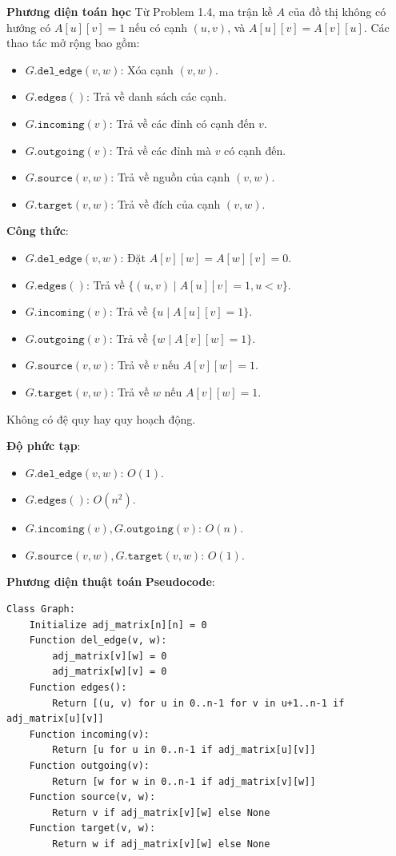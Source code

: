 \documentclass[a4paper,12pt]{article}
\begin{document}
\textbf{Phương diện toán học}
Từ Problem 1.4, ma trận kề \( A \) của đồ thị không có hướng có \( A[u][v] = 1 \) nếu có cạnh \( (u,v) \), và \( A[u][v] = A[v][u] \). Các thao tác mở rộng bao gồm:
\begin{itemize}
    \item \( G.\texttt{del\_edge}(v, w) \): Xóa cạnh \( (v,w) \).
    \item \( G.\texttt{edges}() \): Trả về danh sách các cạnh.
    \item \( G.\texttt{incoming}(v) \): Trả về các đỉnh có cạnh đến \( v \).
    \item \( G.\texttt{outgoing}(v) \): Trả về các đỉnh mà \( v \) có cạnh đến.
    \item \( G.\texttt{source}(v, w) \): Trả về nguồn của cạnh \( (v,w) \).
    \item \( G.\texttt{target}(v, w) \): Trả về đích của cạnh \( (v,w) \).
\end{itemize}

\textbf{Công thức}:
\begin{itemize}
    \item \( G.\texttt{del\_edge}(v, w) \): Đặt \( A[v][w] = A[w][v] = 0 \).
    \item \( G.\texttt{edges}() \): Trả về \( \{(u,v) \mid A[u][v] = 1, u < v\} \).
    \item \( G.\texttt{incoming}(v) \): Trả về \( \{u \mid A[u][v] = 1\} \).
    \item \( G.\texttt{outgoing}(v) \): Trả về \( \{w \mid A[v][w] = 1\} \).
    \item \( G.\texttt{source}(v, w) \): Trả về \( v \) nếu \( A[v][w] = 1 \).
    \item \( G.\texttt{target}(v, w) \): Trả về \( w \) nếu \( A[v][w] = 1 \).
\end{itemize}
Không có đệ quy hay quy hoạch động.

\textbf{Độ phức tạp}:
\begin{itemize}
    \item \( G.\texttt{del\_edge}(v, w) \): \( O(1) \).
    \item \( G.\texttt{edges}() \): \( O(n^2) \).
    \item \( G.\texttt{incoming}(v), G.\texttt{outgoing}(v) \): \( O(n) \).
    \item \( G.\texttt{source}(v, w), G.\texttt{target}(v, w) \): \( O(1) \).
\end{itemize}

\textbf{Phương diện thuật toán}
\textbf{Pseudocode}:
\begin{verbatim}
Class Graph:
    Initialize adj_matrix[n][n] = 0
    Function del_edge(v, w):
        adj_matrix[v][w] = 0
        adj_matrix[w][v] = 0
    Function edges():
        Return [(u, v) for u in 0..n-1 for v in u+1..n-1 if adj_matrix[u][v]]
    Function incoming(v):
        Return [u for u in 0..n-1 if adj_matrix[u][v]]
    Function outgoing(v):
        Return [w for w in 0..n-1 if adj_matrix[v][w]]
    Function source(v, w):
        Return v if adj_matrix[v][w] else None
    Function target(v, w):
        Return w if adj_matrix[v][w] else None
\end{verbatim}
\end{document}
